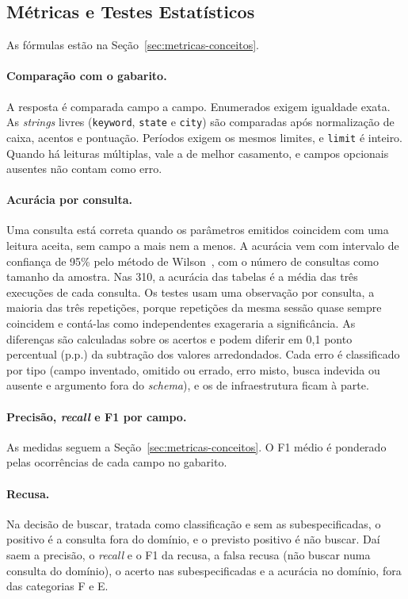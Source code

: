 \subsection{Métricas e Testes Estatísticos}
\label{sec:metricas}

As fórmulas estão na Seção~\ref{sec:metricas-conceitos}.

\paragraph{Comparação com o gabarito.} A resposta é comparada campo a campo. Enumerados exigem igualdade exata. As \textit{strings} livres (\texttt{keyword}, \texttt{state} e \texttt{city}) são comparadas após normalização de caixa, acentos e pontuação. Períodos exigem os mesmos limites, e \texttt{limit} é inteiro. Quando há leituras múltiplas, vale a de melhor casamento, e campos opcionais ausentes não contam como erro.

\paragraph{Acurácia por consulta.} Uma consulta está correta quando os parâmetros emitidos coincidem com uma leitura aceita, sem campo a mais nem a menos. A acurácia vem com intervalo de confiança de 95\% pelo método de Wilson~\cite{wilson1927probable}, com o número de consultas como tamanho da amostra. Nas 310, a acurácia das tabelas é a média das três execuções de cada consulta. Os testes usam uma observação por consulta, a maioria das três repetições, porque repetições da mesma sessão quase sempre coincidem e contá-las como independentes exageraria a significância. As diferenças são calculadas sobre os acertos e podem diferir em 0,1 ponto percentual (p.p.) da subtração dos valores arredondados. Cada erro é classificado por tipo (campo inventado, omitido ou errado, erro misto, busca indevida ou ausente e argumento fora do \textit{schema}), e os de infraestrutura ficam à parte.

\paragraph{Precisão, \textit{recall} e F1 por campo.} As medidas seguem a Seção~\ref{sec:metricas-conceitos}. O F1 médio é ponderado pelas ocorrências de cada campo no gabarito.

\paragraph{Recusa.} Na decisão de buscar, tratada como classificação e sem as subespecificadas, o positivo é a consulta fora do domínio, e o previsto positivo é não buscar. Daí saem a precisão, o \textit{recall} e o F1 da recusa, a falsa recusa (não buscar numa consulta do domínio), o acerto nas subespecificadas e a acurácia no domínio, fora das categorias F e E.

